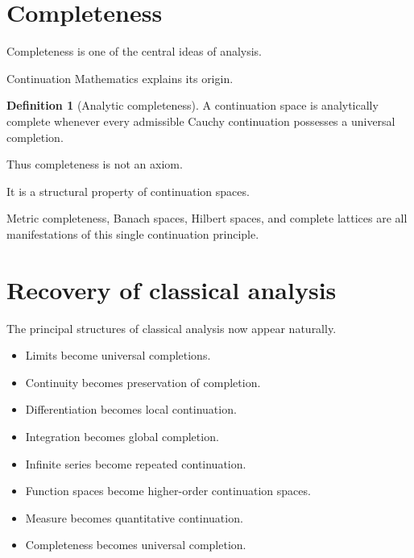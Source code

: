 \documentclass[13pt,openany]{book}
\theoremstyle{plain}
\theoremstyle{definition}
\newtheorem{definition}{Definition}[chapter]
\begin{document}
\section{Completeness}

Completeness is one of the central ideas of analysis.

Continuation Mathematics explains its origin.

\begin{definition}[Analytic completeness]
A continuation space is analytically complete whenever every admissible Cauchy
continuation possesses a universal completion.
\end{definition}

Thus completeness is not an axiom.

It is a structural property of continuation spaces.

Metric completeness, Banach spaces, Hilbert spaces, and complete lattices are
all manifestations of this single continuation principle.

\section{Recovery of classical analysis}

The principal structures of classical analysis now appear naturally.

\begin{itemize}
\item Limits become universal completions.
\item Continuity becomes preservation of completion.
\item Differentiation becomes local continuation.
\item Integration becomes global completion.
\item Infinite series become repeated continuation.
\item Function spaces become higher-order continuation spaces.
\item Measure becomes quantitative continuation.
\item Completeness becomes universal completion.
\end{itemize}
\end{document}
